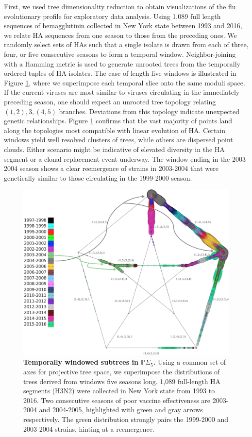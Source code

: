 \documentclass[a4paper,11pt]{article}
\begin{document}
First, we used tree dimensionality reduction to obtain visualizations
of the flu evolutionary profile for exploratory data analysis.
Using 1,089 full length sequences of hemagglutinin collected in New York state between 1993 and 2016, we relate HA sequences from one season to those from the preceding ones.
We randomly select sets of HAs such that a single isolate is drawn from each of three, four, or five consecutive seasons to form a temporal window.
Neighbor-joining with a Hamming metric is used to generate unrooted trees from the temporally ordered tuples of HA isolates.
The case of length five windows is illustrated in Figure \ref{fig:flu_quint}, where we superimpose each temporal slice onto the same moduli space.
If the current viruses are most similar to viruses circulating in the
immediately preceding season, one should expect an unrooted tree
topology relating $(1,2),3,(4,5)$ branches. Deviations from this
topology indicate unexpected genetic relationships.  Figure \ref{fig:flu_quint} confirms that the vast majority of points land along the topologies most compatible with linear evolution of HA.
Certain windows yield well resolved clusters of trees, while others are dispersed point clouds.
Either scenario might be indicative of elevated diversity in the HA segment or a clonal replacement event underway.
The window ending in the 2003-2004 season shows a clear reemergence of strains in 2003-2004 that were genetically similar to those circulating in the 1999-2000 season.~\cite{holmes2005whole}

\begin{figure}
    \centering
    \includegraphics[width=6in]{../figures/influenza_quint.png}
    \caption{{\bf Temporally windowed subtrees in $\mathbb{P}\Sigma_5$.} Using a common set of axes for projective tree space, we superimpose the distributions of trees derived from windows five seasons long. 1,089 full-length HA segments (H3N2) were collected in New York state from 1993 to 2016. Two consecutive seasons of poor vaccine effectiveness are 2003-2004 and 2004-2005, highlighted with green and gray arrows respectively. The green distribution strongly pairs the 1999-2000 and 2003-2004 strains, hinting at a reemergence.}
    \label{fig:flu_quint}
\end{figure}
\end{document}
